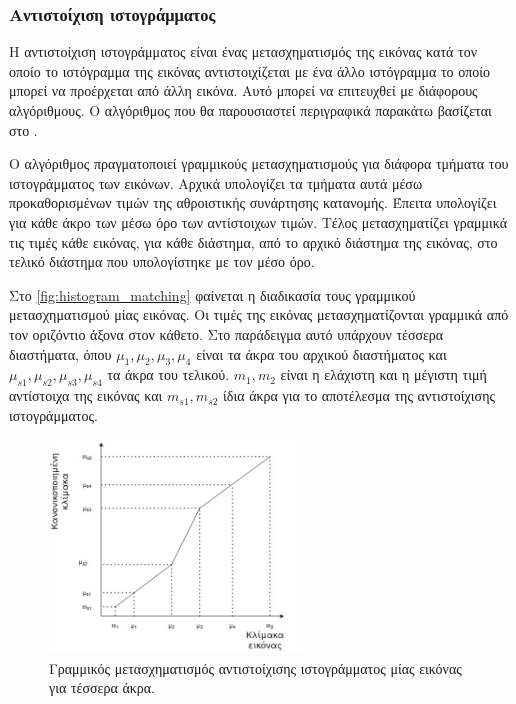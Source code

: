 \documentclass[a4paper,12pt]{article}
\begin{document}
\subsubsection{Αντιστοίχιση ιστογράμματος} \label{histogram:1}

Η αντιστοίχιση ιστογράμματος είναι ένας μετασχηματισμός της εικόνας κατά τον
οποίο το ιστόγραμμα της εικόνας αντιστοιχίζεται με ένα άλλο ιστόγραμμα το οποίο
μπορεί να προέρχεται από άλλη εικόνα. Αυτό μπορεί να επιτευχθεί με διάφορους
αλγόριθμους. Ο αλγόριθμος που θα παρουσιαστεί περιγραφικά παρακάτω βασίζεται στο
\cite{histogram_matching:1}.

Ο αλγόριθμος πραγματοποιεί γραμμικούς μετασχηματισμούς για διάφορα τμήματα του
ιστογράμματος των εικόνων. Αρχικά υπολογίζει τα τμήματα αυτά μέσω
προκαθορισμένων τιμών της αθροιστικής συνάρτησης κατανομής. Έπειτα υπολογίζει
για κάθε άκρο των μέσω όρο των αντίστοιχων τιμών. Τέλος μετασχηματίζει γραμμικά
τις τιμές κάθε εικόνας, για κάθε διάστημα, από το αρχικό διάστημα της εικόνας,
στο τελικό διάστημα που υπολογίστηκε με τον μέσο όρο.

Στο \autoref{fig:histogram_matching} φαίνεται η διαδικασία τους γραμμικού
μετασχηματισμού μίας εικόνας. Οι τιμές της εικόνας μετασχηματίζονται γραμμικά
από τον οριζόντιο άξονα στον κάθετο. Στο παράδειγμα αυτό υπάρχουν τέσσερα
διαστήματα, όπου $\mu_1, \mu_2, \mu_3, \mu_4$ είναι τα άκρα του αρχικού
διαστήματος και $\mu_{s1}, \mu_{s2}, \mu_{s3}, \mu_{s4}$ τα άκρα του τελικού.
$m_1, m_2$ είναι η ελάχιστη και η μέγιστη τιμή αντίστοιχα της εικόνας και
$m_{s1}, m_{s2}$ ίδια άκρα για το αποτέλεσμα της αντιστοίχισης ιστογράμματος.

\begin{figure}[H]
    \centering
    \includegraphics[width=0.6\textwidth]{histogram_matching_2}

    \caption{Γραμμικός μετασχηματισμός αντιστοίχισης ιστογράμματος μίας εικόνας
             για τέσσερα άκρα.}
    \label{fig:histogram_matching}
\end{figure}
\end{document}
